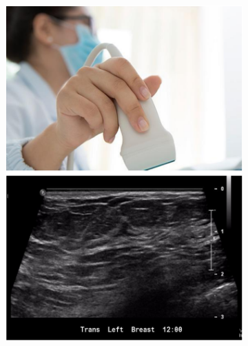 \begin{figure}
\begin{subfigure}[t]{0.32\textwidth}
         \includegraphics[width=\textwidth]{figure/introdution/bus}
         \label{subfig:bus}
     \end{subfigure}
     \begin{subfigure}[t]{0.32\textwidth}
         \centering

\end{subfigure}
\end{figure}
